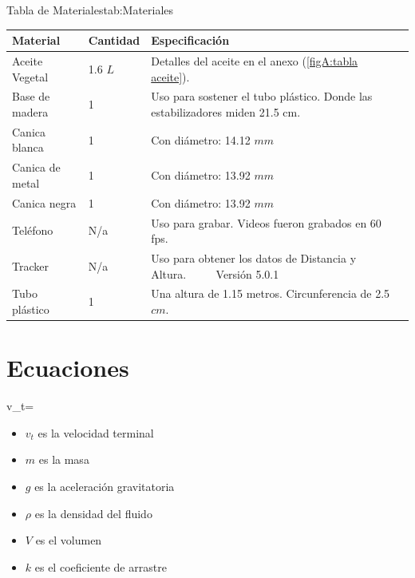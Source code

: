 \documentclass[12pt,a4paper]{config/myConfig}
\begin{document}
\begin{TableLab}{Tabla de Materiales}{}{tab:Materiales}
    \begin{tabularx}{\textwidth}{@{} l l >{\hsize}Y  >{\raggedright\arraybackslash}X @{}}
        \toprule
        \textbf{Material} & \textbf{Cantidad} & \textbf{Especificación} \\
        \midrule
        Aceite Vegetal & 1.6 $L$ & Detalles del aceite en el anexo (\cref{figA:tabla aceite}).  \\
        Base de madera & 1 & Uso para sostener el tubo plástico. Donde las estabilizadores miden 21.5 cm.  \\
        Canica blanca & 1 & Con diámetro: 14.12 $mm$\\
        Canica de metal  & 1 & Con diámetro: 13.92 $mm$   \\
        Canica negra & 1 & Con diámetro: 13.92 $mm$\\
        Teléfono & N/a & Uso para grabar. Videos fueron grabados en 60 fps.\\
        Tracker & N/a & Uso para obtener los datos de Distancia y Altura. $\quad \quad$ Versión  5.0.1\\
        Tubo plástico & 1 & Una altura de 1.15 metros. Circunferencia de 2.5 $cm$.  \\
        \bottomrule
    \end{tabularx}
\end{TableLab}




\section{Ecuaciones}
\label{sec:ECUACIONES}


\begin{EquationLab}
{ v_t= } %
{
\begin{itemize}[label=$\circ$, left=0pt]
    \item $v_t$ es la velocidad terminal
    \item $m$ es la masa
    \item $g$ es la aceleración gravitatoria
    \item $\rho$ es la densidad del fluido
    \item $V$ es el volumen
    \item $k$ es el coeficiente de arrastre
    
\end{itemize}
} %
\end{EquationLab}
\end{document}
